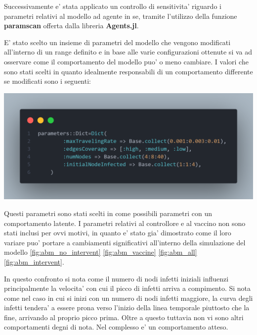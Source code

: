 Successivamente e' stata applicato un controllo di sensitivita' riguardo i parametri 
relativi al modello ad agente in se, tramite l'utilizzo della funzione \textbf{paramscan} offerta
dalla libreria \textbf{Agents.jl}.

E' stato scelto un insieme di parametri del modello che vengono modificati all'interno di un range 
definito e in base alle varie configurazioni ottenute si va ad osservare come il comportamento del modello 
puo' o meno cambiare. I valori che sono stati scelti in quanto idealmente responsabili di un comportamento 
differente se modificati sono i seguenti: 

\begin{minipage}{\linewidth}
	\centering
	\includegraphics[width=\textwidth]{img/paramscan.png}
	\label{fig:paramscan}
\end{minipage}

Questi parametri sono stati scelti in come possibili parametri con un comportamento latente. I parametri 
relativi al controllore e al vaccino non sono stati inclusi per ovvi motivi, in quanto e' stato gia' dimostrato 
come il loro variare puo' portare a cambiamenti significativi all'interno della simulazione del modello \ref{fig:abm_no_intervent}
\ref{fig:abm_vaccine} \ref{fig:abm_all} \ref{fig:abm_intervent}.

\newpage

In questo confronto si nota come il numero di nodi infetti iniziali influenzi principalmente la velocita' con cui 
il picco di infetti arriva a compimento. Si nota come nel caso in cui si inizi con un numero di nodi infetti maggiore, 
la curva degli infetti tendera' a essere prona verso l'inizio della linea temporale piuttosto che la fine, arrivando 
al proprio picco prima. Oltre a questo tuttavia non vi sono altri comportamenti degni di nota. Nel complesso e' un
comportamento atteso.

